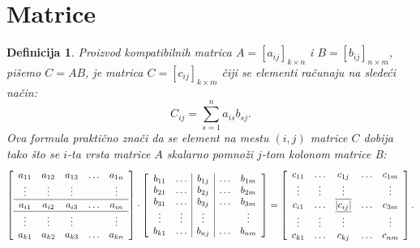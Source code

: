\documentclass[10pt, a4paper]{article}
\newtheorem{define}{Definicija}
\begin{document}
\section{Matrice}
\begin{define}
    {\normalfont Proizvod} kompatibilnih matrica $A = [a_{ij}]_{k \times n}$ i $B = [b_{ij}]_{n \times m}$,
    pi\v{s}emo $C = AB$, je matrica $C = [c_{ij}]_{k \times m}$ \v{c}iji se elementi ra\v{c}unaju na slede\'ci na\v{c}in:
    \[
        C_{ij} = \sum_{s=1}^n a_{is}b_{sj}.
    \]
    Ova formula prakti\v{c}no zna\v{c}i da se element na mestu $(i, j)$ matrice $C$ dobija tako \v{s}to se
    $i$-ta vrsta matrice $A$ {\normalfont skalarno pomno\v{z}i} $j$-tom kolonom matrice B:
    \[
        \left[
        \begin{array}[]{ccccc}
            a_{11} & a_{12} & a_{13} & \ldots & a_{1n} \\
            \vdots & \vdots & \vdots & & \vdots \\
            \hline
            a_{i1} & a_{i2} & a_{i3} & \ldots & a_{in} \\
            \hline
            \vdots & \vdots & \vdots & & \vdots \\
            a_{k1} & a_{k2} & a_{k3} & \ldots & a_{kn} \\
        \end{array}
        \right]
        \cdot
        \left[
        \begin{array}[]{cc|c|cc}
            b_{11} & \ldots & b_{1j} & \ldots & b_{1m} \\
            b_{21} & \ldots & b_{2j} & \ldots & b_{2m} \\
            b_{31} & \ldots & b_{3j} & \ldots & b_{3m} \\
            \vdots & \vdots & \vdots & & \vdots \\
            b_{k1} & \ldots & b_{nj} & \ldots & b_{nm} \\
        \end{array}
        \right] =
        \left[
        \begin{array}[]{ccccc}
            c_{11} & \ldots & c_{1j} & \ldots & c_{1m} \\
            \vdots & \vdots & \vdots & & \vdots \\
            c_{i1} & \ldots & \overline{\underline{|c_{ij}|}} & \ldots & c_{3m} \\
            \vdots & \vdots & \vdots & & \vdots \\
            c_{k1} & \ldots & c_{kj} & \ldots & c_{nm} \\
        \end{array}
        \right].
    \]  

\end{define}
\end{document}
